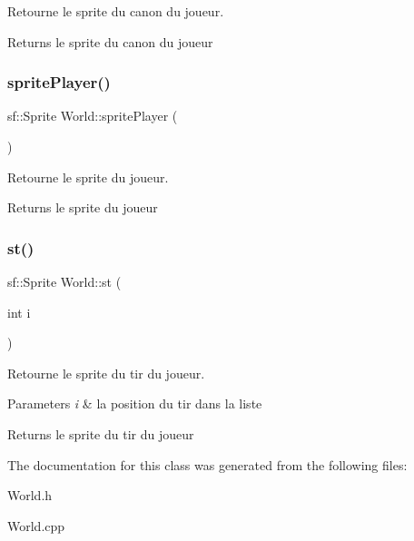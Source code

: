 Retourne le sprite du canon du joueur. 

\begin{DoxyReturn}{Returns}
le sprite du canon du joueur 
\end{DoxyReturn}
\mbox{\label{classWorld_ab2d9a669d4fff12fc637bead8ac9c850}} 
\subsubsection{\texorpdfstring{sprite\+Player()}{spritePlayer()}}
{\footnotesize\ttfamily sf\+::\+Sprite World\+::sprite\+Player (\begin{DoxyParamCaption}{ }\end{DoxyParamCaption})}



Retourne le sprite du joueur. 

\begin{DoxyReturn}{Returns}
le sprite du joueur 
\end{DoxyReturn}
\mbox{\label{classWorld_ad54259b8e35a3424e6aae5e530ab7811}} 
\subsubsection{\texorpdfstring{st()}{st()}}
{\footnotesize\ttfamily sf\+::\+Sprite World\+::st (\begin{DoxyParamCaption}\item[{int}]{i }\end{DoxyParamCaption})}



Retourne le sprite du tir du joueur. 


\begin{DoxyParams}{Parameters}
{\em i} & la position du tir dans la liste \\
\hline
\end{DoxyParams}
\begin{DoxyReturn}{Returns}
le sprite du tir du joueur 
\end{DoxyReturn}


The documentation for this class was generated from the following files\+:\begin{DoxyCompactItemize}
\item 
World.\+h\item 
World.\+cpp\end{DoxyCompactItemize}
